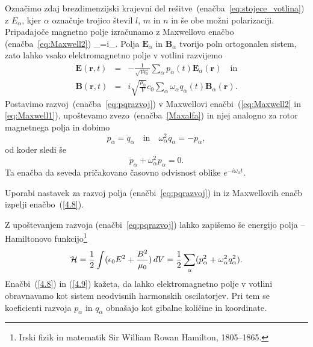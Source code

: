 Označimo zdaj brezdimenzijski krajevni del rešitve~(enačba~\ref{eq:stojece_votlina}) z 
$E_{\alpha}$, kjer $\alpha$
označuje trojico števil $l$, $m$ in $n$ in še obe možni polarizaciji. 
Pripadajoče magnetno polje izračunamo z Maxwellovo enačbo (enačba~\ref{eq:Maxwell2}) 
\beq
\nabla\times{}_{\alpha}=i\omega{}_{\alpha}.
\label{Maxalfa}
\eeq
Polja $\mathbf{E}_{\alpha}$ in $\mathbf{B}_{\alpha}$ tvorijo poln ortogonalen
sistem, zato lahko vsako elektromagnetno polje v votlini razvijemo
\begin{eqnarray}
\mathbf{E}(\mathbf{r},t) & = & -\frac{1}{\sqrt{V\epsilon_{0}}}
\sum_{\alpha}p_{\alpha}(t)\mathbf{E}_{\alpha}(\mathbf{r}) \quad \mathrm{in}\nonumber \\
\mathbf{B}(\mathbf{r},t) & = & i\sqrt{\frac{\mu_{0}}{V}}c_0\sum_{\alpha}
\omega_{\alpha}q_{\alpha}(t)\mathbf{B}_{\alpha}(\mathbf{r}).
\label{eq:pqrazvoj}
\end{eqnarray}
Postavimo razvoj~(enačba~\ref{eq:pqrazvoj}) v Maxwellovi enačbi~(\ref{eq:Maxwell2}
in \ref{eq:Maxwell1}), upoštevamo zvezo~(enačba~\ref{Maxalfa}) in njej analogno za rotor magnetnega polja
in dobimo 
\begin{equation}
p_{\alpha}=\dot{q}_{\alpha} \quad \mathrm{in} \quad 
\omega_{\alpha}^{2}q_{\alpha}=-\dot{p}_{\alpha},
\label{4.7}
\end{equation}
od koder sledi še 
\begin{equation}
\ddot{p}_{\alpha}+\omega_{\alpha}^{2}p_{\alpha}=0.
\label{4.8}
\end{equation}
Ta enačba da seveda pričakovano časovno odvisnost oblike $e^{-i \omega_\alpha t}$.

\begin{definition}
 Uporabi nastavek za razvoj polja (enačbi~\ref{eq:pqrazvoj}) in iz Maxwellovih enačb izpelji
 enačbo~(\ref{4.8}).
\end{definition}

Z upoštevanjem razvoja (enačbi~\ref{eq:pqrazvoj}) lahko zapišemo še energijo 
polja -- Hamiltonovo 
funkcijo\footnote{Irski fizik in matematik Sir William Rowan Hamilton, 1805--1865.}
\begin{equation}
{\cal H}=\frac{1}{2}\int(\epsilon_{0}E^{2}+\frac{B^{2}}{\mu_0})\, 
dV=\frac{1}{2}\sum_{\alpha}(p_{\alpha}^{2}+\omega_{\alpha}^{2}q_{\alpha}^{2}).
\label{4.9}
\end{equation}
Enačbi~(\ref{4.8}) in (\ref{4.9}) kažeta, da lahko elektromagnetno polje v votlini
obravnavamo kot sistem neodvisnih harmonskih oscilatorjev. 
Pri tem se koeficienti razvoja $p_{\alpha}$ in $q_{\alpha}$ obnašajo kot
gibalne količine in koordinate. 


